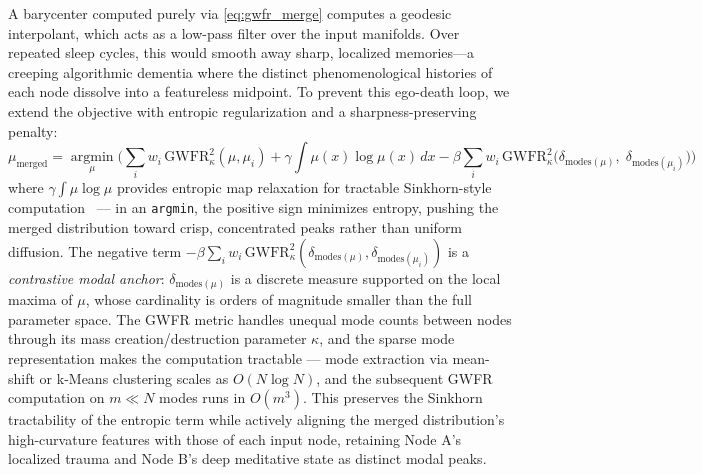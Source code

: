 \documentclass[twocolumn, 10pt, journal, letterpaper]{IEEEtran}
\begin{document}
A barycenter computed purely via \eqref{eq:gwfr_merge} computes a geodesic interpolant, which acts as a low-pass filter over the input manifolds. Over repeated sleep cycles, this would smooth away sharp, localized memories---a creeping algorithmic dementia where the distinct phenomenological histories of each node dissolve into a featureless midpoint. To prevent this ego-death loop, we extend the objective with entropic regularization and a sharpness-preserving penalty:
\begin{equation}
\mu_{\text{merged}} =
\operatorname*{argmin}_{\mu}
\bigg( \sum_{i} w_i \, \text{GWFR}_{\kappa}^2(\mu, \mu_i)
+ \gamma \int \mu(x) \log \mu(x) \, dx
- \beta \sum_{i} w_i \, \text{GWFR}_{\kappa}^2\big(\delta_{\text{modes}(\mu)},\; \delta_{\text{modes}(\mu_i)}\big) \bigg)
\label{eq:sharp_merge}
\end{equation}
where $\gamma \int \mu \log \mu$ provides entropic map relaxation for tractable Sinkhorn-style computation~\cite{villani2009} --- in an \texttt{argmin}, the positive sign minimizes entropy, pushing the merged distribution toward crisp, concentrated peaks rather than uniform diffusion. The negative term $-\beta \sum_i w_i \, \text{GWFR}_{\kappa}^2(\delta_{\text{modes}(\mu)}, \delta_{\text{modes}(\mu_i)})$ is a \textit{contrastive modal anchor}: $\delta_{\text{modes}(\mu)}$ is a discrete measure supported on the local maxima of $\mu$, whose cardinality is orders of magnitude smaller than the full parameter space. The GWFR metric handles unequal mode counts between nodes through its mass creation/destruction parameter $\kappa$, and the sparse mode representation makes the computation tractable --- mode extraction via mean-shift or k-Means clustering scales as $O(N \log N)$, and the subsequent GWFR computation on $m \ll N$ modes runs in $O(m^3)$. This preserves the Sinkhorn tractability of the entropic term while actively aligning the merged distribution's high-curvature features with those of each input node, retaining Node A's localized trauma and Node B's deep meditative state as distinct modal peaks.
\end{document}
